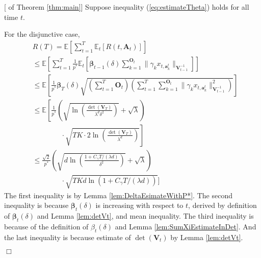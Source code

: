\documentclass{article}
\newcommand{\bbeta}{\boldsymbol{\beta}}
\newcommand{\EE}{\mathbb{E}}
\newcommand{\bA}{\mathbf{A}}
\newcommand{\ba}{\mathbf{a}}
\newcommand{\bO}{\mathbf{O}}
\newcommand{\bV}{\mathbf{V}}
\newcommand{\norm}[1]{\| #1 \|}
\newenvironment{proof}{\noindent {\textbf{Proof. }}}{$\Box$ \medskip}
\begin{document}
\begin{proof}[ of Theorem \ref{thm:main}]
Suppose inequality (\ref{eq:estimateTheta}) holds for all time $t$. 

For the disjunctive case,
\begin{equation}
\begin{split}
&R(T) = \EE[\sum_{t=1}^{T} \EE_{t}[R(t, \bA_t)] ]\\
&\leq \EE\left[\sum_{t=1}^{T} \frac{1}{p^*} \EE_t \left[\bbeta_{t-1}(\delta) \sum_{k=1}^{\bO_t}\norm{\gamma_k x_{t,\ba_k^t}}_{\bV_{t-1}^{-1}}\right] \right]\\
&\leq \EE \left[\frac{1}{p^*} \bbeta_T(\delta) \sqrt{\left(\sum_{t=1}^{T} \bO_t\right) \left( \sum_{t=1}^{T} \sum_{k=1}^{\bO_t}\norm{\gamma_k x_{t,\ba_k^t}}_{\bV_{t-1}^{-1}}^2 \right)}
	\right ]  \\
&\leq \EE\left[\frac{1}{p^*} \left( \sqrt{ \ln \left( \frac{\det(\bV_T)}{\lambda^d \delta^2} \right)} + \sqrt{\lambda} \right) \right. \\
& \left. \qquad \qquad \cdot \sqrt{TK \cdot 2\ln \left(\frac{\det(\bV_T)}{\lambda^d} \right)} \right]\\
&\leq \frac{\sqrt{2}}{p^*} \left(\sqrt{ d \ln \left( \frac{1 + C_\gamma T/(\lambda d)}{\delta^2} \right) } + \sqrt{\lambda} \right)\\
&\qquad \qquad \cdot \sqrt{TKd\ln(1 + C_\gamma T/(\lambda d))} ]
\end{split}
\end{equation}
The first inequality is by Lemma \ref{lem:DeltaEsimateWithP*}. The second inequality is because $\bbeta_{t}(\delta)$ is increasing with respect to $t$, derived by definition of $\bbeta_t(\delta)$ and Lemma \ref{lem:detVt}, and mean inequality. The third inequality is because of the definition of $\beta_t(\delta)$ and Lemma \ref{lem:SumXiEstimateInDet}. And the last inequality is because estimate of $\det(\bV_t)$ by Lemma \ref{lem:detVt}.


\end{proof}
\end{document}
